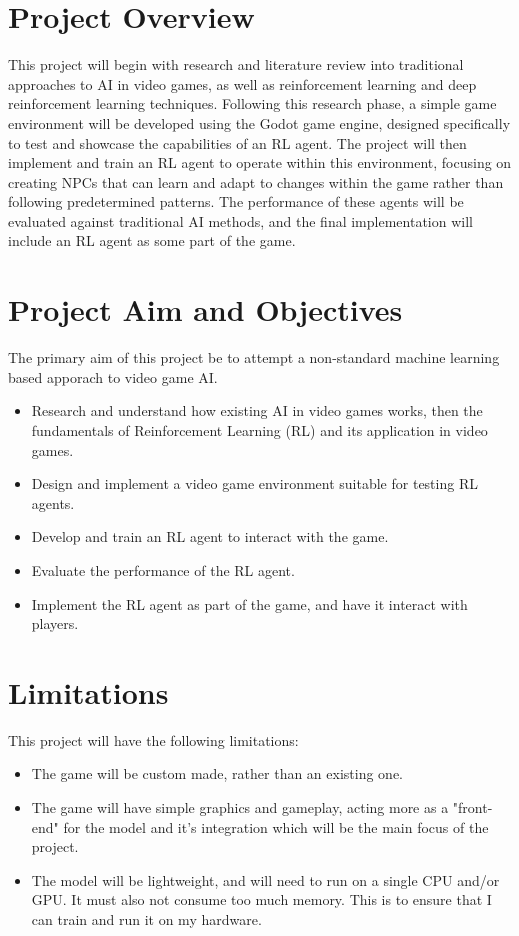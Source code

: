 \section{Project Overview}
This project will begin with research and literature review into traditional approaches to AI in video games, as well as reinforcement learning and deep reinforcement learning techniques. 
Following this research phase, a simple game environment will be developed using the Godot game engine, designed specifically to test and showcase the capabilities of an RL agent. 
The project will then implement and train an RL agent to operate within this environment, focusing on creating NPCs that can learn and adapt to changes within the game rather than following predetermined patterns. 
The performance of these agents will be evaluated against traditional AI methods, and the final implementation will include an RL agent as some part of the game. 

\section{Project Aim and Objectives}
The primary aim of this project be to attempt a non-standard machine learning based apporach to video game AI.
\begin{itemize} 
    \item Research and understand how existing AI in video games works, then the fundamentals of Reinforcement Learning (RL) and its application in video games.
    \item Design and implement a video game environment suitable for testing RL agents.
    \item Develop and train an RL agent to interact with the game.
    \item Evaluate the performance of the RL agent.
    \item Implement the RL agent as part of the game, and have it interact with players.
\end{itemize}

\section{Limitations}
This project will have the following limitations:
\begin{itemize} 
    \item The game will be custom made, rather than an existing one.
    \item The game will have simple graphics and gameplay, acting more as a "front-end" for the model and it's integration which will be the main focus of the project.
    \item The model will be lightweight, and will need to run on a single CPU and/or GPU. It must also not consume too much memory. This is to ensure that I can train and run it on my hardware.
\end{itemize}
